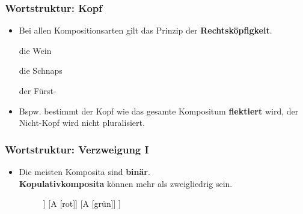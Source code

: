 \begin{frame}
\frametitle{Wortstruktur: Kopf}

\begin{itemize}
	\item Bei allen Kompositionsarten gilt das Prinzip der \textbf{Rechtsköpfigkeit}.
	
	\settowidth{} 
	\ea 
		\ea die Wein \jambox{[Determinativkompositum]} 
		
			\z 		
		
		\ex die Schnaps 	\jambox{\hfill [Possessivkompositum]} 
			\z 
	
		
		\ex der Fürst- \jambox{[Kopulativkompositum]} 
			\z 		
		\z 
	\z 

	\item Bspw. bestimmt der Kopf wie das gesamte Kompositum \textbf{flektiert} wird, der Nicht-Kopf wird nicht pluralisiert.

\end{itemize}

\end{frame}


\begin{frame}
\frametitle{Wortstruktur: Verzweigung I}

\begin{itemize}
	\item Die meisten Komposita sind \textbf{binär}. \\
	\textbf{Kopulativkomposita} können mehr als zweigliedrig sein.
\begin{figure}
	\centering

\begin{forest}
		[A
			[A [rot]]
			[A [rot]]
			[A [grün]]
		]
\end{forest}	

\end{figure}

\end{itemize}
\end{frame}
	
